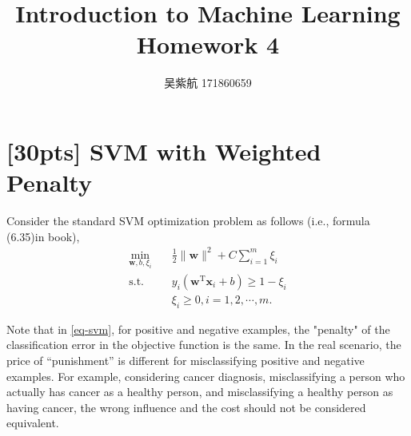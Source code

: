 \documentclass{article}
\title{Introduction to Machine Learning\\Homework 4}
\author{吴紫航 171860659}
\date{}
\begin{document}
	\maketitle
	
	
%	
%	
%	
	
    \section{[30pts] SVM with Weighted Penalty}
    Consider the standard SVM optimization problem as follows (i.e., formula (6.35)in book),
    \begin{equation}
    	\label{eq-svm}
    	\begin{split}
    		\min_{\mathbf{w},b,\xi_i}& \quad \frac{1}{2} \lVert \mathbf{w} \rVert^2 + C\sum_{i=1}^m\xi_i\\
    		\text{s.t.}&  \quad y_i(\mathbf{w}^\mathrm{T}\mathbf{x}_i + b)\geq 1-\xi_i\\
    		& \quad \xi_i \geq 0, i = 1,2,\cdots,m.
    	\end{split}
    \end{equation}

    Note that in \eqref{eq-svm}, for positive and negative examples, the "penalty" of the classification error in the objective function is the same. In the real scenario, the price of “punishment” is different for misclassifying positive and negative examples. For example, considering cancer diagnosis, misclassifying a person who actually has cancer as a healthy person, and misclassifying a healthy person as having cancer, the wrong influence and the cost should not be considered equivalent.
\end{document}
